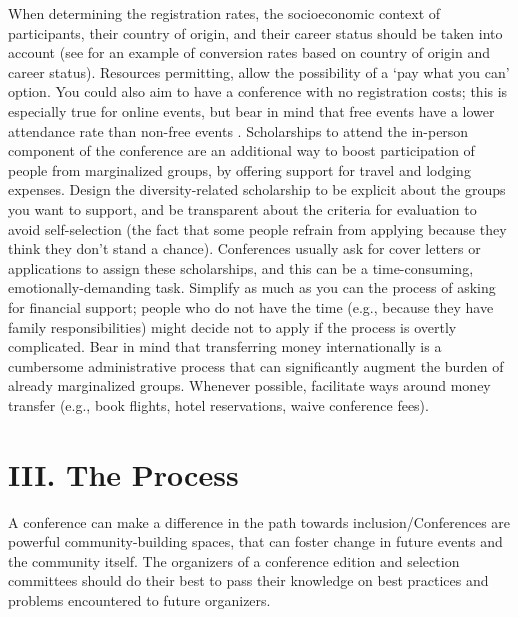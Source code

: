 \documentclass[10pt,letterpaper]{article}
\begin{document}
When determining the registration rates, the socioeconomic context of participants, their country of origin, and their career status should be taken into account  \cite{sarabipourChangingScientificMeetings2021, andalibPostdocQueueLabour2018, kaplanPostdocNot2012}
(see \cite{canelon2021cost} for an example of conversion rates based on country of origin and career status). 
Resources permitting, allow the possibility of a `pay what you can' option. You could also aim to have a conference with no registration costs; this is especially true for online events, but bear in mind that free events have a lower attendance rate than non-free events \cite{eventbrite_ultimate_2017}. 
Scholarships to attend the in-person component of the conference are an additional way to boost participation of people from marginalized groups, by offering support for travel and lodging expenses.
Design the diversity-related scholarship to be explicit about the groups you want to support, and be transparent about the criteria for evaluation to avoid self-selection (the fact that some people refrain from applying because they think they don't stand a chance). 
Conferences usually ask for cover letters or applications to assign these scholarships, and this can be a time-consuming, emotionally-demanding task. 
Simplify as much as you can the process of asking for financial support; 
people who do not have the time (e.g., because they have family responsibilities) might decide not to apply if the process is overtly complicated. 
Bear in mind that transferring money internationally is a cumbersome administrative process that can significantly augment the burden of already marginalized groups. Whenever possible, facilitate ways around money transfer (e.g., book flights, hotel reservations, waive conference fees).



\section*{III. The Process}

A conference can make a difference in the path towards inclusion/Conferences are powerful community-building spaces, that can foster change in future events and the community itself. The organizers of a conference edition and selection committees should do their best to pass their knowledge on best practices and problems encountered to future organizers.
\end{document}
